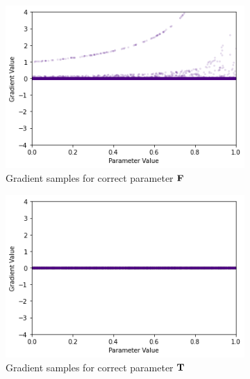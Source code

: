 \begin{figure}[ht]
    \centering
    \begin{subfigure}[b]{0.47\textwidth}
        \centering
        \includegraphics[width=\textwidth]{imgs/grad_prod_bce_falseparam_100dim.png}
        \caption{Gradient samples for correct parameter $\textbf{F}$}
        \label{fig:conjgrad100falsebce}
    \end{subfigure}
    \begin{subfigure}[b]{0.47\textwidth}
        \centering
        \includegraphics[width=\textwidth]{imgs/grad_prod_bce_trueparam_100dim.png}
        \caption{Gradient samples for correct parameter $\textbf{T}$}
        \label{fig:conjgrad100truebce}
    \end{subfigure}
    \begin{subfigure}[b]{0.47\textwidth}
        \centering

\end{subfigure}
\end{figure}
